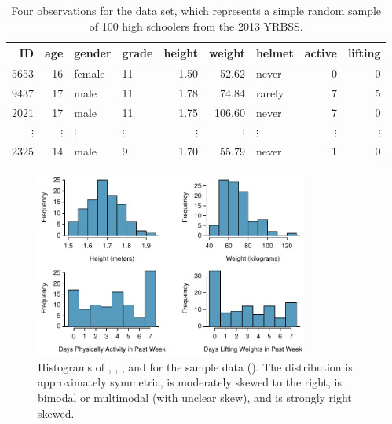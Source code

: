 \begin{spacing}{1.5}
\begin{table}
\centering
\begin{tabular}{rrllrrlrr}
  \hline
ID & age & gender & grade & height & weight & helmet & active & lifting \\ 
  \hline
5653 &  16 & female & 11 & 1.50 & 52.62 & never &   0 &   0 \\ 
  9437 &  17 & male & 11 & 1.78 & 74.84 & rarely &   7 &   5 \\ 
  2021 &  17 & male & 11 & 1.75 & 106.60 & never &   7 &   0 \\ 
  $\vdots$ & $\vdots$ & $\vdots$ & $\vdots$ & $\vdots$ & $\vdots$ & $\vdots$ & $\vdots$ & $\vdots$ \\
  2325 &  14 & male & 9 & 1.70 & 55.79 & never &   1 &   0 \\ 
   \hline
\end{tabular}
\caption{Four observations for the  data set, which represents a simple random sample of 100 high schoolers from the 2013 YRBSS.}
\label{yrbssSampDF}
\end{table}


\begin{figure}
\centering
\includegraphics[width=0.8\textwidth]
{ch_inference_foundations_oi_biostat/figures/yrbssSampHistograms/yrbssSampHistograms} 
\caption{Histograms of , , , and  for the sample data (). The  distribution is approximately symmetric,  is moderately skewed to the right,  is bimodal or multimodal (with unclear skew), and  is strongly right skewed.}
\label{yrbssSampHistograms}
\end{figure}


\end{spacing}

